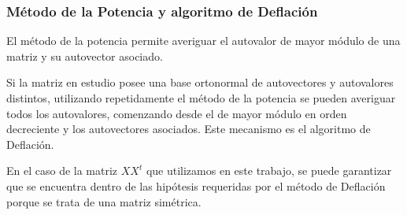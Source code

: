 \subsubsection*{Método de la Potencia y algoritmo de Deflación}
\par El método de la potencia permite averiguar el autovalor de mayor módulo de una matriz y su autovector asociado.
\par Si la matriz en estudio posee una base ortonormal de autovectores y autovalores distintos, utilizando repetidamente el método de la potencia se pueden averiguar todos los autovalores, comenzando desde el de mayor módulo en orden decreciente y los autovectores asociados. Este mecanismo es el algoritmo de Deflación.
\par En el caso de la matriz $XX^{t}$ que utilizamos en este trabajo, se puede garantizar que se encuentra dentro de las hipótesis requeridas por el método de Deflación porque se trata de una matriz simétrica.
